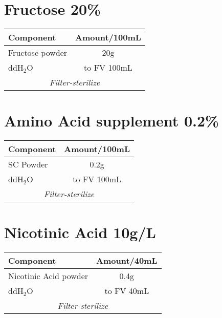 \documentclass[a4paper,10pt]{article}
\begin{document}
\section*{Fructose 20\%}

\begin{tabular}{ | l c | }
	\hline
 	\textbf{Component} & \textbf{Amount/100mL} \\
	\hline\hline
	Fructose powder & 20g \\ 
	\hline \hline
	ddH$_2$O & to FV 100mL \\
	\hline \hline
	\multicolumn{2}{|c|}{\textit{Filter-sterilize}} \\
	\hline
\end{tabular}

\section*{Amino Acid supplement 0.2\%}

\begin{tabular}{ | l c | }
	\hline
 	\textbf{Component} & \textbf{Amount/100mL} \\
	\hline\hline
	SC Powder & 0.2g \\ 
	\hline \hline
	ddH$_2$O & to FV 100mL \\
	\hline \hline
	\multicolumn{2}{|c|}{\textit{Filter-sterilize}} \\
	\hline
\end{tabular}


\section*{Nicotinic Acid 10g/L}

\begin{tabular}{ | l c | }
	\hline
 	\textbf{Component} & \textbf{Amount/40mL} \\
	\hline\hline
	Nicotinic Acid powder & 0.4g \\ 
	\hline \hline
	ddH$_2$O & to FV 40mL \\
	\hline \hline
	\multicolumn{2}{|c|}{\textit{Filter-sterilize}} \\
	\hline
\end{tabular}
\end{document}
